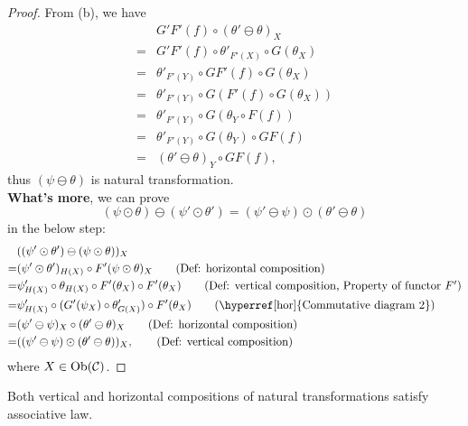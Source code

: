 \documentclass{article}
\begin{document}
\begin{proof}
	From (b), we have
	\begin{align*}
		& G'F'(f)\circ(\theta'\ominus\theta)_X\\
		=& G'F'(f)\circ\theta'_{F'(X)}\circ G(\theta_X)\tag{Def: horizontal composition}\\
		=& \theta'_{F'(Y)}\circ GF'(f)\circ G(\theta_X)\tag{Property of natural transformation $\theta'$}\\
		=& \theta'_{F'(Y)}\circ G(F'(f)\circ G(\theta_X))\tag{Property of functor $G$}\\
		=& \theta'_{F'(Y)}\circ G(\theta_Y\circ F(f))\tag{Property of natural transformation $\theta$}\\
		=& \theta'_{F'(Y)}\circ G(\theta_Y)\circ GF(f)\tag{Property of functor $G$}\\
		=& (\theta'\ominus\theta)_Y\circ GF(f)\tag{Def: horizontal composition},
	\end{align*}
	thus $(\psi\ominus\theta)$ is natural transformation.\\
		
	{\bf What's more}, we can prove
		\begin{equation}\label{per}
			(\psi\odot\theta)\ominus(\psi'\odot\theta')=(\psi'\ominus\psi)\odot(\theta'\ominus\theta)
		\end{equation}
	in the below step:
	\begin{align*}
		 & ((\psi'\odot\theta')\ominus(\psi\odot\theta))_X\\
		=& (\psi'\odot\theta')_{H(X)}\circ F'(\psi\odot\theta)_X\tag{Def: horizontal composition}\\
		=& \psi'_{H(X)}\circ\theta_{H(X)}\circ F'(\theta_X)\circ F'(\theta_X)\tag{Def: vertical composition, Property of functor $F'$}\\
		=& \psi'_{H(X)}\circ(G'(\psi_X)\circ \theta'_{G(X)})\circ F'(\theta_X)\tag{\hyperref[hor]{Commutative diagram 2}}\\
		=& (\psi'\ominus\psi)_X\circ(\theta'\ominus\theta)_X\tag{Def: horizontal composition}\\
		=& ((\psi'\ominus\psi)\odot(\theta'\ominus\theta))_X,\tag{Def: vertical composition}
	\end{align*}
	where $X\in\mathrm{Ob}(\mathcal{C})$.
\end{proof}

\begin{thm}
	Both vertical and horizontal compositions of natural transformations satisfy associative law.
\end{thm}
\end{document}
